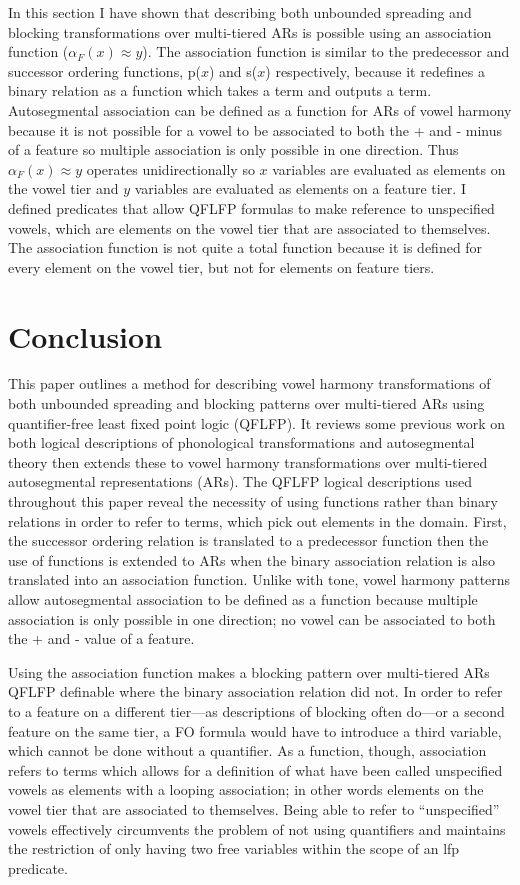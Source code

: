 \documentclass[,doc,floatsintext]{apa6}
\theoremstyle{definition}
\theoremstyle{definition}
\theoremstyle{definition}
\theoremstyle{remark}
\begin{document}
In this section I have shown that describing both unbounded spreading
and blocking transformations over multi-tiered ARs is possible using an
association function (\(\alpha_F(x)\approx y\)). The association
function is similar to the predecessor and successor ordering functions,
p(\(x\)) and s(\(x\)) respectively, because it redefines a binary
relation as a function which takes a term and outputs a term.
Autosegmental association can be defined as a function for ARs of vowel
harmony because it is not possible for a vowel to be associated to both
the + and - minus of a feature so multiple association is only possible
in one direction. Thus \(\alpha_F(x)\approx y\) operates
unidirectionally so \(x\) variables are evaluated as elements on the
vowel tier and \(y\) variables are evaluated as elements on a feature
tier. I defined predicates that allow QFLFP formulas to make reference
to unspecified vowels, which are elements on the vowel tier that are
associated to themselves. The association function is not quite a total
function because it is defined for every element on the vowel tier, but
not for elements on feature tiers.

\section{Conclusion}\label{conclusion}

This paper outlines a method for describing vowel harmony
transformations of both unbounded spreading and blocking patterns over
multi-tiered ARs using quantifier-free least fixed point logic (QFLFP).
It reviews some previous work on both logical descriptions of
phonological transformations and autosegmental theory then extends these
to vowel harmony transformations over multi-tiered autosegmental
representations (ARs). The QFLFP logical descriptions used throughout
this paper reveal the necessity of using functions rather than binary
relations in order to refer to terms, which pick out elements in the
domain. First, the successor ordering relation is translated to a
predecessor function then the use of functions is extended to ARs when
the binary association relation is also translated into an association
function. Unlike with tone, vowel harmony patterns allow autosegmental
association to be defined as a function because multiple association is
only possible in one direction; no vowel can be associated to both the +
and - value of a feature.

Using the association function makes a blocking pattern over
multi-tiered ARs QFLFP definable where the binary association relation
did not. In order to refer to a feature on a different tier---as
descriptions of blocking often do---or a second feature on the same
tier, a FO formula would have to introduce a third variable, which
cannot be done without a quantifier. As a function, though, association
refers to terms which allows for a definition of what have been called
unspecified vowels as elements with a looping association; in other
words elements on the vowel tier that are associated to themselves.
Being able to refer to \enquote{unspecified} vowels effectively
circumvents the problem of not using quantifiers and maintains the
restriction of only having two free variables within the scope of an lfp
predicate.
\end{document}
